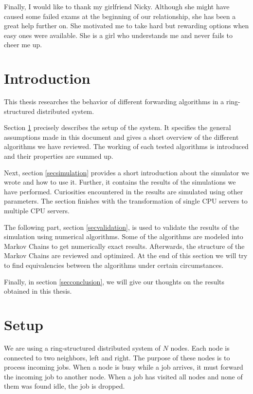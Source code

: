 \documentclass[10pt,a4paper]{article}
\begin{document}
Finally, I would like to thank my girlfriend Nicky. Although she might have caused some failed exams at the beginning of our relationship, she has been a great help further on. She motivated me to take hard but rewarding options when easy ones were available. She is a girl who understands me and never fails to cheer me up.

\newpage

\tableofcontents

\newpage

\section*{Introduction}
This thesis researches the behavior of different forwarding algorithms in a ring-structured distributed system.

Section \ref{secsetup} precisely describes the setup of the system. It specifies the general assumptions made in this document and gives a short overview of the different algorithms we have reviewed. The working of each tested algorithms is introduced and their properties are summed up.

Next, section \ref{secsimulation} provides a short introduction about the simulator we wrote and how to use it. Further, it contains the results of the simulations we have performed. Curiosities encountered in the results are simulated using other parameters. The section finishes with the transformation of single CPU servers to multiple CPU servers.

The following part, section \ref{secvalidation}, is used to validate the results of the simulation using numerical algorithms. Some of the algorithms are modeled into Markov Chains to get numerically exact results. Afterwards, the structure of the Markov Chains are reviewed and optimized. At the end of this section we will try to find equivalencies between the algorithms under certain circumstances.

Finally, in section \ref{secconclusion}, we will give our thoughts on the results obtained in this thesis.

\section{Setup}
\label{secsetup}
We are using a ring-structured distributed system of $N$ nodes. Each node is connected to two neighbors, left and right. The purpose of these nodes is to process incoming jobs. When a node is busy while a job arrives, it must forward the incoming job to another node. When a job has visited all nodes and none of them was found idle, the job is dropped.
\end{document}
